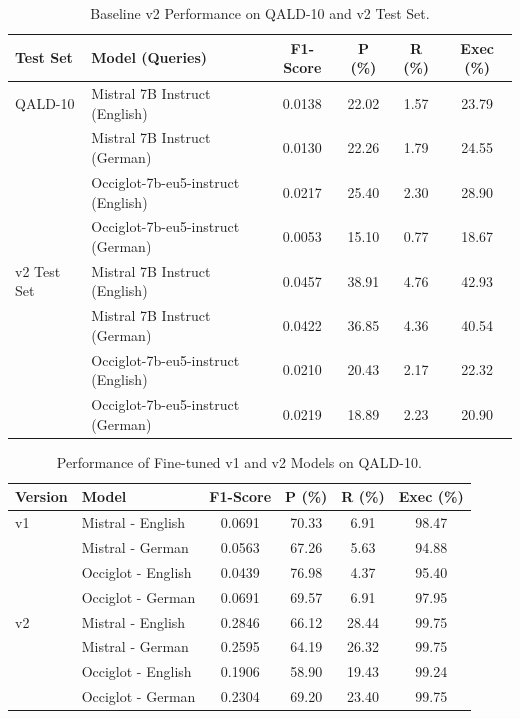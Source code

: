 \begin{table}[htbp]
\centering
\caption{Baseline v2 Performance on QALD-10 and v2 Test Set.}
\label{tab:baseline_v2_all}
\begin{tabular}{@{}llcccc@{}}
\toprule
\textbf{Test Set} & \textbf{Model (Queries)} & \textbf{F1-Score} & \textbf{P (\%)} & \textbf{R (\%)} & \textbf{Exec (\%)} \\
\midrule
QALD-10 & Mistral 7B Instruct (English) & 0.0138 & 22.02 & 1.57 & 23.79 \\
& Mistral 7B Instruct (German) & 0.0130 & 22.26 & 1.79 & 24.55 \\
& Occiglot-7b-eu5-instruct (English) & 0.0217 & 25.40 & 2.30 & 28.90 \\
& Occiglot-7b-eu5-instruct (German) & 0.0053 & 15.10 & 0.77 & 18.67 \\
\midrule
v2 Test Set & Mistral 7B Instruct (English) & 0.0457 & 38.91 & 4.76 & 42.93 \\
& Mistral 7B Instruct (German) & 0.0422 & 36.85 & 4.36 & 40.54 \\
& Occiglot-7b-eu5-instruct (English) & 0.0210 & 20.43 & 2.17 & 22.32 \\
& Occiglot-7b-eu5-instruct (German) & 0.0219 & 18.89 & 2.23 & 20.90 \\
\bottomrule
\end{tabular}
\end{table}

\begin{table}[htbp]
\centering
\caption{Performance of Fine-tuned v1 and v2 Models on QALD-10.}
\label{tab:finetuned_qald10_all}
\begin{tabular}{@{}llcccc@{}}
\toprule
\textbf{Version} & \textbf{Model} & \textbf{F1-Score} & \textbf{P (\%)} & \textbf{R (\%)} & \textbf{Exec (\%)} \\
\midrule
v1 & Mistral - English & 0.0691 & 70.33 & 6.91 & 98.47 \\
& Mistral - German  & 0.0563 & 67.26 & 5.63 & 94.88 \\
& Occiglot - English& 0.0439 & 76.98 & 4.37 & 95.40 \\
& Occiglot - German & 0.0691 & 69.57 & 6.91 & 97.95 \\
\midrule
v2 & Mistral - English & 0.2846 & 66.12 & 28.44 & 99.75 \\
& Mistral - German & 0.2595 & 64.19 & 26.32 & 99.75 \\
& Occiglot - English& 0.1906 & 58.90 & 19.43 & 99.24 \\
& Occiglot - German & 0.2304 & 69.20 & 23.40 & 99.75 \\
\bottomrule
\end{tabular}
\end{table}

